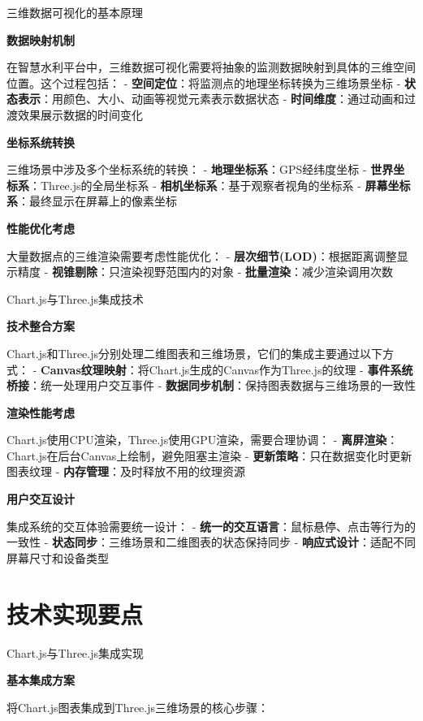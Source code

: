  三维数据可视化的基本原理

\textbf{数据映射机制}

在智慧水利平台中，三维数据可视化需要将抽象的监测数据映射到具体的三维空间位置。这个过程包括： - \textbf{空间定位}：将监测点的地理坐标转换为三维场景坐标 - \textbf{状态表示}：用颜色、大小、动画等视觉元素表示数据状态 - \textbf{时间维度}：通过动画和过渡效果展示数据的时间变化

\textbf{坐标系统转换}

三维场景中涉及多个坐标系统的转换： - \textbf{地理坐标系}：GPS经纬度坐标 - \textbf{世界坐标系}：Three.js的全局坐标系 - \textbf{相机坐标系}：基于观察者视角的坐标系 - \textbf{屏幕坐标系}：最终显示在屏幕上的像素坐标

\textbf{性能优化考虑}

大量数据点的三维渲染需要考虑性能优化： - \textbf{层次细节(LOD)}：根据距离调整显示精度 - \textbf{视锥剔除}：只渲染视野范围内的对象 - \textbf{批量渲染}：减少渲染调用次数

 Chart.js与Three.js集成技术

\textbf{技术整合方案}

Chart.js和Three.js分别处理二维图表和三维场景，它们的集成主要通过以下方式： - \textbf{Canvas纹理映射}：将Chart.js生成的Canvas作为Three.js的纹理 - \textbf{事件系统桥接}：统一处理用户交互事件 - \textbf{数据同步机制}：保持图表数据与三维场景的一致性

\textbf{渲染性能考虑}

Chart.js使用CPU渲染，Three.js使用GPU渲染，需要合理协调： - \textbf{离屏渲染}：Chart.js在后台Canvas上绘制，避免阻塞主渲染 - \textbf{更新策略}：只在数据变化时更新图表纹理 - \textbf{内存管理}：及时释放不用的纹理资源

\textbf{用户交互设计}

集成系统的交互体验需要统一设计： - \textbf{统一的交互语言}：鼠标悬停、点击等行为的一致性 - \textbf{状态同步}：三维场景和二维图表的状态保持同步 - \textbf{响应式设计}：适配不同屏幕尺寸和设备类型

\section{技术实现要点}

 Chart.js与Three.js集成实现

\textbf{基本集成方案}

将Chart.js图表集成到Three.js三维场景的核心步骤：

